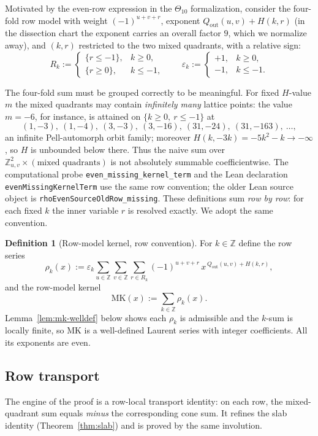 \documentclass[12pt]{amsart}
\theoremstyle{definition}
\newtheorem{definition}[theorem]{Definition}
\theoremstyle{remark}
\newcommand{\ZZ}{\mathbb{Z}}
\newcommand{\MK}{\mathrm{MK}}
\begin{document}
Motivated by the even-row expression in the $\Theta_{10}$
formalization, consider the four-fold row model with weight
$(-1)^{u+v+r}$, exponent
$Q_{\mathrm{out}}(u,v)+H(k,r)$ (in the dissection chart the exponent
carries an overall factor $9$, which we normalize away), and $(k,r)$
restricted to the two mixed quadrants, with a relative sign:
\[
  R_k:=\begin{cases}\{r\le-1\},&k\ge0,\\[2pt] \{r\ge0\},&k\le-1,\end{cases}
  \qquad
  \varepsilon_k:=\begin{cases}+1,&k\ge0,\\[2pt] -1,&k\le-1.\end{cases}
\]

The four-fold sum must be grouped correctly to be meaningful.  For
fixed $H$-value $m$ the mixed quadrants may contain \emph{infinitely
many} lattice points: the value $m=-6$, for instance, is attained on
$\{k\ge0,\ r\le-1\}$ at
\[
  (1,-3),\ (1,-4),\ (3,-3),\ (3,-16),\ (31,-24),\ (31,-163),\ \dots,
\]
an infinite Pell-automorph orbit family; moreover
$H(k,-3k)=-5k^2-k\to-\infty$, so $H$ is unbounded below there.  Thus
the naive sum over $\ZZ^2_{u,v}\times(\text{mixed quadrants})$ is not
absolutely summable coefficientwise.  The computational probe
\texttt{even\_missing\_kernel\_term} and the Lean declaration
\texttt{evenMissingKernelTerm} use the same row convention; the older
Lean source object is \texttt{rhoEvenSourceOldRow\_missing}.  These
definitions sum \emph{row by row}: for each fixed $k$ the inner
variable $r$ is resolved exactly.  We adopt the same convention.

\begin{definition}[Row-model kernel, row convention]\label{def:mk}
For $k\in\ZZ$ define the row series
\[
  \rho_k(x):=\varepsilon_k
  \sum_{u\in\ZZ}\sum_{v\in\ZZ}\sum_{r\in R_k}
  (-1)^{u+v+r}\,x^{\,Q_{\mathrm{out}}(u,v)+H(k,r)} ,
\]
and the row-model kernel
\[
  \MK(x):=\sum_{k\in\ZZ}\rho_k(x).
\]
Lemma~\ref{lem:mk-welldef} below shows each $\rho_k$ is admissible and
the $k$-sum is locally finite, so $\MK$ is a well-defined Laurent
series with integer coefficients.  All its exponents are even.
\end{definition}

\subsection{Row transport}

The engine of the proof is a row-local transport identity: on each
row, the mixed-quadrant sum equals \emph{minus} the corresponding cone
sum.  It refines the slab identity (Theorem~\ref{thm:slab}) and is
proved by the same involution.
\end{document}
